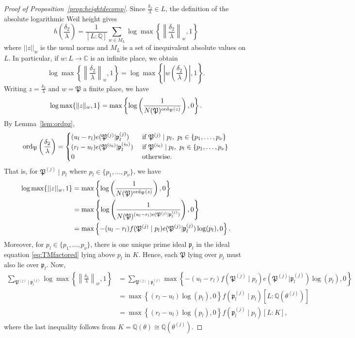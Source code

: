 \begin{proof}[Proof of Proposition~\ref{prop:heightdecomp}]Since $\frac{\delta_2}{\lambda} \in L$, the definition of the absolute logarithmic Weil height gives
\[h\left(\frac{\delta_2}{\lambda}\right)=\frac{1}{[L:\mathbb{Q}]}\sum_{w \in M_L} \log \max \left\{ \left\|\frac{\delta_2}{\lambda}\right\|_{w}, 1\right\}\]
where $||z||_w$ is the usual norms and $M_L$ is a set of inequivalent absolute values on $L$. In particular, if $w: L \to \mathbb{C}$ is an infinite place, we obtain
\[ \log \max \left\{ \left\|\frac{\delta_2}{\lambda}\right\|_{w}, 1\right\} = \log \max \left\{ \left|w\left(\frac{\delta_2}{\lambda}\right)\right|, 1\right\}.\]
Writing $z = \frac{\delta_2}{\lambda}$ and $w = \mathfrak{P}$ a finite place, we have
\[ \log \max \{ \|z\|_{w}, 1\} = \max \left\{ \log\left(\frac{1}{N(\mathfrak{P})^{\operatorname{ord}_{\mathfrak{P}}(z)}} \right), 0\right\}. \]
By Lemma~\ref{lem:ordpz}, 
\[\operatorname{ord}_{\mathfrak{P}}\left( \frac{\delta_2}{\lambda}\right)=
\begin{cases}
(u_l - r_l)e(\mathfrak{P}^{(j)}|\mathfrak{p}_l^{(j)})	
	& \textnormal{ if } \mathfrak{P}^{(j)} \mid p_l , \ p_l \in \{p_1,\dots, p_{\nu}\}\\
(r_l - u_l)e(\mathfrak{P}^{(i_0)}|\mathfrak{p}_l^{(i_0)})
	& \textnormal{ if } \mathfrak{P}^{(i_0)}\mid p_l, \ p_l \in \{p_1,\dots, p_{\nu}\}\\
0 	& \textnormal{ otherwise}.
\end{cases}\]
That is, for $\mathfrak{P}^{(j)}\mid p_l$ where $p_l \in \{p_1, \dots, p_{\nu}\}$, we have
\begin{align*}
 \log \max \{ ||z||_{w}, 1\}	
 	& = \max \left\{ \log\left(\frac{1}{N(\mathfrak{P})^{\operatorname{ord}_{\mathfrak{P}}(z)}} \right), 0\right\}\\
	& = \max \left\{ \log\left(\frac{1}{N(\mathfrak{P})^{(u_l - r_l)e(\mathfrak{P}^{(j)}|\mathfrak{p}_l^{(j)})}} \right), 0\right\}\\
	& = \max \left\{ -(u_l - r_l)f(\mathfrak{P}^{(j)}\mid p_l)e(\mathfrak{P}^{(j)}|\mathfrak{p}_l^{(j)})\log(p_l), 0\right\}.
\end{align*}
Moreover, for $p_l \in \{p_1, \dots, p_{\nu}\}$, there is one unique prime ideal $\mathfrak{p}_l$ in the ideal equation \eqref{eq:TMfactored} lying above $p_l$ in $K$. Hence, each $\mathfrak{P}$ lying over $p_l$ must also lie over $\mathfrak{p}_l$. Now, 
\begin{align*}
\sum_{\mathfrak{P}^{(j)} \mid \mathfrak{p}_l^{(j)}} \log \max \left\{ \left\|\frac{\delta_2}{\lambda}\right\|_{w}, 1\right\}
	& = \sum_{\mathfrak{P}^{(j)} \mid \mathfrak{p}_l^{(j)}} \max \left\{ -(u_l - r_l)f(\mathfrak{P}^{(j)}\mid p_l)e(\mathfrak{P}^{(j)}|\mathfrak{p}_l^{(j)})\log(p_l), 0\right\}\\
	& = \max \left\{ (r_l - u_l)\log(p_l), 0\right\}f(\mathfrak{p}_l^{(j)}\mid p_l)[L:\mathbb{Q}(\theta^{(j)})]\\
	& = \max \left\{ (r_l - u_l)\log(p_l), 0\right\}f(\mathfrak{p}_l^{(j)}\mid p_l)[L:K],
\end{align*}
where the last inequality follows from $K = \mathbb{Q}(\theta) \cong \mathbb{Q}(\theta^{(j)})$.


\end{proof}
